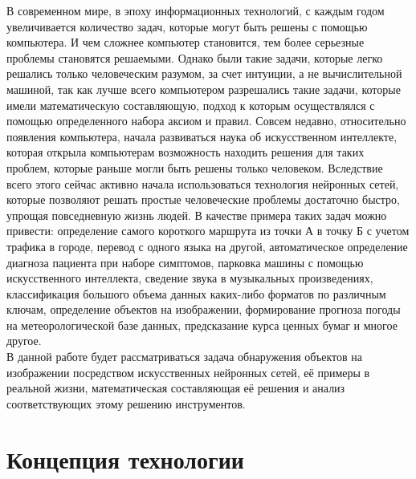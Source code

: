 \documentclass[bachelor, och, coursework]{shiza}
\begin{document}


\tableofcontents

\intro

    В современном мире, в эпоху информационных технологий, с каждым годом увеличивается количество задач, которые могут быть решены с помощью компьютера. И чем сложнее компьютер становится, тем более серьезные проблемы становятся решаемыми. Однако были такие задачи, которые легко решались только человеческим разумом, за счет интуиции, а не вычислительной машиной, так как лучше всего компьютером разрешались такие задачи, которые имели математическую составляющую, подход к которым осуществлялся с помощью определенного набора аксиом и правил. Совсем недавно, относительно появления компьютера, начала развиваться наука об искусственном интеллекте, которая открыла компьютерам возможность находить решения для таких проблем, которые раньше могли быть решены только человеком. Вследствие всего этого сейчас активно начала использоваться технология нейронных сетей, которые позволяют решать простые человеческие проблемы достаточно быстро, упрощая повседневную жизнь людей. В качестве примера таких задач можно привести: определение самого короткого маршрута из точки А в точку Б с учетом трафика в городе, перевод с одного языка на другой, автоматическое определение диагноза пациента при наборе симптомов, парковка машины с помощью искусственного интеллекта, сведение звука в музыкальных произведениях, классификация большого объема данных каких-либо форматов по различным ключам, определение объектов на изображении, формирование прогноза погоды на метеорологической базе данных, предсказание курса ценных бумаг и многое другое.\\
    В данной работе будет рассматриваться задача обнаружения объектов на изображении посредством искусственных нейронных сетей, её примеры в реальной жизни, математическая составляющая её решения и анализ соответствующих этому решению инструментов.

\section{Концепция технологии}
\end{document}
